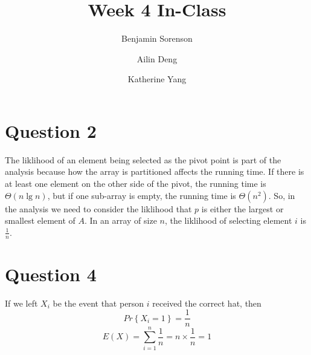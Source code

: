 \documentclass[11pt]{article}  %
\begin{document}
\title{Week 4 In-Class}
\author{
    Benjamin Sorenson \\
    \and
    Ailin Deng \\
    \and
    Katherine Yang
}

\maketitle
\section{Question 2}
The liklihood of an element being selected as the pivot point is part of the
analysis because how the array is partitioned affects the running time. If
there is at least one element on the other side of the pivot, the running
time is \(\Theta\left(n\lg n\right)\), but if one sub-array is empty, the
running time is \(\Theta\left(n^2\right)\). So, in the analysis we need to
consider the liklihood that \(p\) is either the largest or smallest element
of \(A\). In an array of size \(n\), the liklihood of selecting element
\(i\) is \(\frac{1}{n}\).

\section{Question 4}
If we left \(X_i\) be the event that person \(i\) received the correct hat, then
\[ Pr\left\{X_i=1\right\} = \frac{1}{n}\]
\[E\left(X\right)=\sum_{i=1}^{n}{\frac{1}{n}}=n\times\frac{1}{n}=1\]
\end{document}

